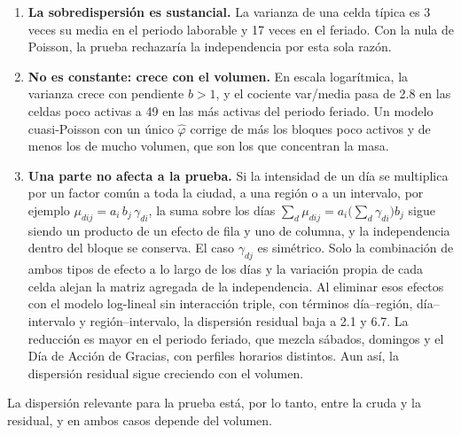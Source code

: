\begin{enumerate}
  \item \textbf{La sobredispersión es sustancial.} La varianza de una celda
  típica es 3 veces su media en el periodo laborable y 17 veces en el feriado.
  Con la nula de Poisson, la prueba rechazaría la independencia por esta sola
  razón.
  \item \textbf{No es constante: crece con el volumen.} En escala logarítmica,
  la varianza crece con pendiente $b > 1$, y el cociente var/media pasa de 2.8 en
  las celdas poco activas a 49 en las más activas del periodo feriado. Un modelo
  cuasi-Poisson con un único $\hat\varphi$ corrige de más los bloques poco
  activos y de menos los de mucho volumen, que son los que concentran la masa.
  \item \textbf{Una parte no afecta a la prueba.} Si la intensidad de un día
  se multiplica por un factor común a toda la ciudad, a una región o a un
  intervalo, por ejemplo $\mu_{dij} = a_i\, b_j\, \gamma_{di}$, la suma sobre
  los días $\sum_d \mu_{dij} = a_i \bigl(\sum_d \gamma_{di}\bigr) b_j$ sigue
  siendo un producto de un efecto de fila y uno de columna, y la independencia
  dentro del bloque se conserva. El caso $\gamma_{dj}$ es simétrico. Solo la
  combinación de ambos tipos de efecto a lo largo de los días y la variación
  propia de cada celda alejan la matriz agregada de la independencia. Al
  eliminar esos efectos con el modelo log-lineal sin interacción triple, con
  términos día--región, día--intervalo y región--intervalo, la dispersión
  residual baja a 2.1 y 6.7. La reducción es mayor en el periodo feriado, que
  mezcla sábados, domingos y el Día de Acción de Gracias, con perfiles horarios
  distintos. Aun así, la dispersión residual sigue creciendo con el volumen.
\end{enumerate}

La dispersión relevante para la prueba está, por lo tanto, entre la cruda y la
residual, y en ambos casos depende del volumen.

